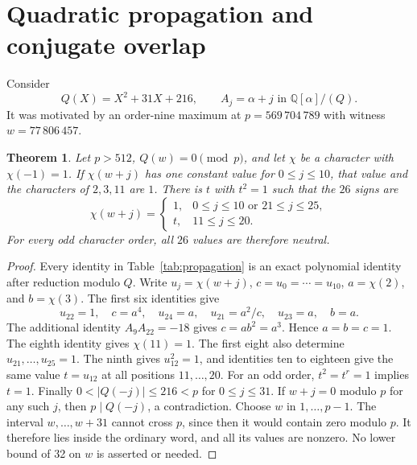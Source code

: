 \documentclass[11pt]{article}
\newtheorem{theorem}{Theorem}[section]
\theoremstyle{definition}\newtheorem{definition}[theorem]{Definition}
\newcommand{\Q}{\mathbb Q}
\begin{document}
\section{Quadratic propagation and conjugate overlap}\label{sec:quadratic}
Consider
\[
 Q(X)=X^2+31X+216,
 \qquad A_j=\alpha+j\text{ in }\Q[\alpha]/(Q).
\]
It was motivated by an order-nine maximum at
$p=569\,704\,789$ with witness $w=77\,806\,457$.
\begin{theorem}\label{thm:propagation}
Let $p>512$, $Q(w)=0\pmod p$, and let $\chi$ be a character with
$\chi(-1)=1$. If $\chi(w+j)$ has one constant value for
$0\le j\le10$, that value and the characters of $2,3,11$ are $1$.
There is $t$ with $t^2=1$ such that the $26$ signs are
\[
 \chi(w+j)=
 \begin{cases}
 1,&0\le j\le10\text{ or }21\le j\le25,\\
 t,&11\le j\le20.
 \end{cases}
\]
For every odd character order, all $26$ values are therefore neutral.
\end{theorem}
\begin{proof}
Every identity in Table~\ref{tab:propagation} is an exact polynomial
identity after reduction modulo $Q$. Write $u_j=\chi(w+j)$,
$c=u_0=\cdots=u_{10}$, $a=\chi(2)$, and $b=\chi(3)$.
The first six identities give
\[
 u_{22}=1,\quad c=a^4,\quad u_{24}=a,
 \quad u_{21}=a^2/c,\quad u_{23}=a,\quad b=a.
\]
The additional identity $A_9A_{22}=-18$ gives $c=ab^2=a^3$.
Hence $a=b=c=1$. The eighth identity gives $\chi(11)=1$.
The first eight also determine $u_{21},\ldots,u_{25}=1$.
The ninth gives $u_{12}^2=1$, and identities ten to eighteen give
the same value $t=u_{12}$ at all positions $11,\ldots,20$.
For an odd order, $t^2=t^r=1$ implies $t=1$.
Finally $0<|Q(-j)|\le216<p$ for $0\le j\le31$. If $w+j=0$
modulo $p$ for any such $j$, then $p\mid Q(-j)$, a contradiction.
Choose $w$ in $1,\ldots,p-1$. The interval $w,\ldots,w+31$
cannot cross $p$, since then it would contain zero modulo $p$.
It therefore lies inside the ordinary word, and all its values are
nonzero. No lower bound of 32 on $w$ is asserted or needed.
\end{proof}
\end{document}
